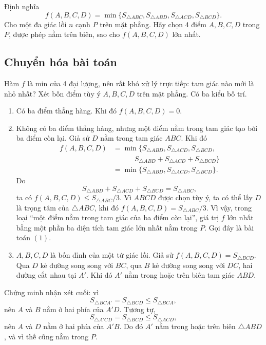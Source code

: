 \documentclass[11pt]{article}
\newcommand{\area}[1]{S_{#1}}
\begin{document}
Định nghĩa
\[
  f(A,B,C,D)=\min\{
  \area{\triangle ABC},\area{\triangle ABD},
  \area{\triangle ACD},\area{\triangle BCD}\}.
\]
Cho một đa giác lồi \(n\) cạnh \(P\) trên mặt phẳng. Hãy chọn 4 điểm
\(A,B,C,D\) trong \(P\), được phép nằm trên biên, sao cho
\(f(A,B,C,D)\) lớn nhất.

\subsection{Chuyển hóa bài toán}

Hàm \(f\) là min của 4 đại lượng, nên rất khó xử lý trực tiếp: tam giác nào
mới là nhỏ nhất? Xét bốn điểm tùy ý \(A,B,C,D\) trên mặt phẳng. Có ba kiểu
bố trí.

\begin{enumerate}
  \item Có ba điểm thẳng hàng. Khi đó \(f(A,B,C,D)=0\).

  \item Không có ba điểm thẳng hàng, nhưng một điểm nằm trong tam giác tạo bởi
  ba điểm còn lại. Giả sử \(D\) nằm trong tam giác \(ABC\). Khi đó
  \[
  \begin{aligned}
    f(A,B,C,D)
    &=\min\{\area{\triangle ABD},\area{\triangle ACD},
      \area{\triangle BCD},\\
    &\qquad\quad
      \area{\triangle ABD}+\area{\triangle ACD}
      +\area{\triangle BCD}\}\\
    &=\min\{\area{\triangle ABD},\area{\triangle ACD},
      \area{\triangle BCD}\}.
  \end{aligned}
  \]
  Do
  \[
    \area{\triangle ABD}+\area{\triangle ACD}
      +\area{\triangle BCD}=\area{\triangle ABC},
  \]
  ta có \(f(A,B,C,D)\le \area{\triangle ABC}/3\). Vì \(ABCD\) được chọn tùy
  ý, ta có thể lấy \(D\) là trọng tâm của \(\triangle ABC\), khi đó
  \(f(A,B,C,D)=\area{\triangle ABC}/3\). Vì vậy, trong loại ``một điểm nằm
  trong tam giác của ba điểm còn lại'', giá trị \(f\) lớn nhất bằng một phần
  ba diện tích tam giác lớn nhất nằm trong \(P\). Gọi đây là bài toán \((1)\).

  \item \(A,B,C,D\) là bốn đỉnh của một tứ giác lồi. Giả sử
  \(f(A,B,C,D)=\area{\triangle BCD}\). Qua \(D\) kẻ đường song song với \(BC\),
  qua \(B\) kẻ đường song song với \(DC\), hai đường cắt nhau tại \(A'\). Khi
  đó \(A'\) nằm trong hoặc trên biên tam giác \(ABD\).
\end{enumerate}

Chứng minh nhận xét cuối: vì
\[
  \area{\triangle BCA'}=\area{\triangle BCD}\le\area{\triangle BCA},
\]
nên \(A\) và \(B\) nằm ở hai phía của \(A'D\). Tương tự,
\[
  \area{\triangle A'CD}=\area{\triangle BCD}\le\area{\triangle ACD},
\]
nên \(A\) và \(D\) nằm ở hai phía của \(A'B\). Do đó \(A'\) nằm trong hoặc
trên biên \(\triangle ABD\), và vì thế cũng nằm trong \(P\).
\end{document}
